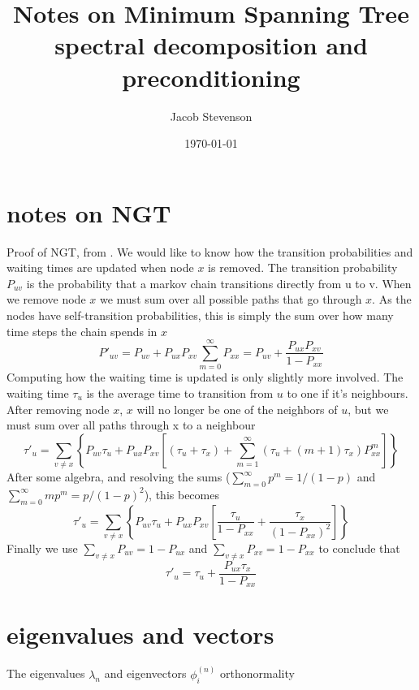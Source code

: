 \documentclass[a4paper]{article}
\title{Notes on Minimum Spanning Tree spectral decomposition and preconditioning}
\author{Jacob Stevenson}
\date{\today}
\begin{document}
\maketitle

\section{notes on NGT}
Proof of NGT, from \cite{wales.2009}.  We would like to know how the transition probabilities and waiting times
are updated when node $x$ is removed.  The transition probability $P_{uv}$ is the probability that a markov chain 
transitions directly from u to v.  When we remove node $x$ we must sum over all possible paths that go through $x$.
As the nodes have self-transition probabilities, this is simply the sum over how many time steps the chain spends in $x$
\begin{equation}
P'_{uv} = P_{uv} + P_{ux} P_{xv} \sum_{m=0}^{\infty} P_{xx} = P_{uv} + \frac{ P_{ux} P_{xv} }{ 1 - P_{xx} }
\end{equation}
Computing how the waiting time is updated is only slightly more involved.  The waiting time $\tau_u$ is the average time to transition
from $u$ to one if it's neighbours.  After removing node $x$, $x$ will no longer be one of the neighbors of $u$, but we must sum
over all paths through x to a neighbour
\begin{equation}
\tau'_u = \sum_{v \ne x} \left\{ 
P_{uv} \tau_u + P_{ux} P_{xv} \left[ 
(\tau_u + \tau_x) + \sum_{m=1}^{\infty} (\tau_u + (m+1) \tau_x) P_{xx}^m
\right]
\right\}
\end{equation}
After some algebra, and resolving the sums ($\sum_{m=0}^{\infty} p^m = 1/(1-p)$ and $\sum_{m=0}^{\infty} m p^m = p/(1-p)^2$), this becomes
\begin{equation}
\tau'_u = \sum_{v \ne x} \left\{ 
P_{uv} \tau_u + P_{ux} P_{xv} \left[ 
\frac{\tau_u}{1-P_{xx}} + \frac{\tau_x}{(1-P_{xx})^2}
\right]
\right\}
\end{equation}
Finally we use $\sum_{v\ne x} P_{uv} = 1-P_{ux}$ and $\sum_{v\ne x} P_{xv} = 1-P_{xx}$ to conclude that
\begin{equation}
\tau'_u = \tau_u + \frac{ P_{ux} \tau_x}{1-P_{xx}}
\end{equation}


\section{eigenvalues and vectors}

The eigenvalues $\lambda_n$ and eigenvectors $\phi^{(n)}_i$ orthonormality
\end{document}
